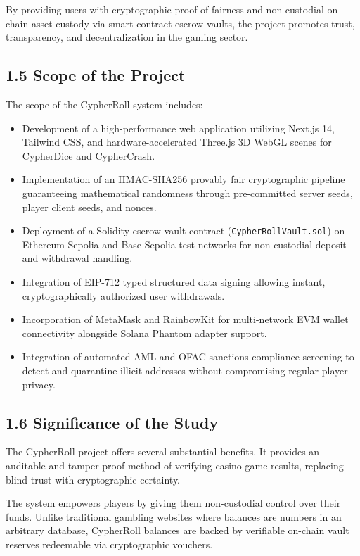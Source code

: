 By providing users with cryptographic proof of fairness and non-custodial on-chain asset custody via smart contract escrow vaults, the project promotes trust, transparency, and decentralization in the gaming sector.

\subsection*{1.5 Scope of the Project}
The scope of the CypherRoll system includes:
\begin{itemize}[leftmargin=1.5em]
    \item Development of a high-performance web application utilizing Next.js 14, Tailwind CSS, and hardware-accelerated Three.js 3D WebGL scenes for CypherDice and CypherCrash.
    \item Implementation of an HMAC-SHA256 provably fair cryptographic pipeline guaranteeing mathematical randomness through pre-committed server seeds, player client seeds, and nonces.
    \item Deployment of a Solidity escrow vault contract (\texttt{CypherRollVault.sol}) on Ethereum Sepolia and Base Sepolia test networks for non-custodial deposit and withdrawal handling.
    \item Integration of EIP-712 typed structured data signing allowing instant, cryptographically authorized user withdrawals.
    \item Incorporation of MetaMask and RainbowKit for multi-network EVM wallet connectivity alongside Solana Phantom adapter support.
    \item Integration of automated AML and OFAC sanctions compliance screening to detect and quarantine illicit addresses without compromising regular player privacy.
\end{itemize}

\subsection*{1.6 Significance of the Study}
The CypherRoll project offers several substantial benefits. It provides an auditable and tamper-proof method of verifying casino game results, replacing blind trust with cryptographic certainty.

The system empowers players by giving them non-custodial control over their funds. Unlike traditional gambling websites where balances are numbers in an arbitrary database, CypherRoll balances are backed by verifiable on-chain vault reserves redeemable via cryptographic vouchers.

